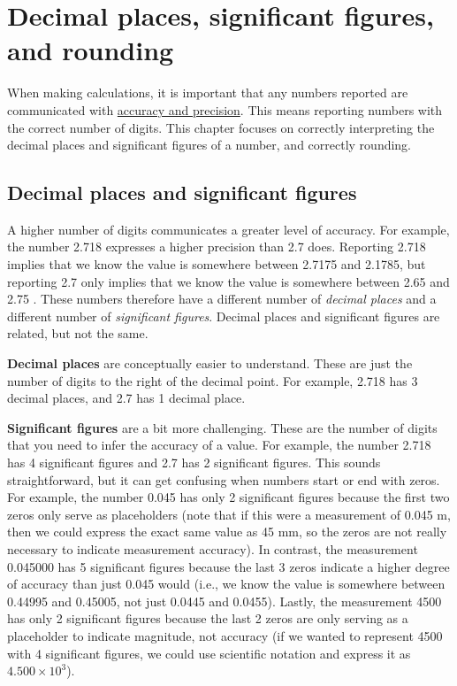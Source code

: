 \documentclass[
  openany]{scrbook}
\begin{document}
\hypertarget{Chapter_9}{%
\chapter{Decimal places, significant figures, and rounding}\label{Chapter_9}}

When making calculations, it is important that any numbers reported are communicated with \protect\hyperlink{Chapter_6}{accuracy and precision}.
This means reporting numbers with the correct number of digits.
This chapter focuses on correctly interpreting the decimal places and significant figures of a number, and correctly rounding.

\hypertarget{decimal-places-and-significant-figures}{%
\section{Decimal places and significant figures}\label{decimal-places-and-significant-figures}}

A higher number of digits communicates a greater level of accuracy.
For example, the number 2.718 expresses a higher precision than 2.7 does.
Reporting 2.718 implies that we know the value is somewhere between 2.7175 and 2.1785, but reporting 2.7 only implies that we know the value is somewhere between 2.65 and 2.75 \citep{Sokal1995}.
These numbers therefore have a different number of \emph{decimal places} and a different number of \emph{significant figures}.
Decimal places and significant figures are related, but not the same.

\textbf{Decimal places} are conceptually easier to understand. These are just the number of digits to the right of the decimal point. For example, 2.718 has 3 decimal places, and 2.7 has 1 decimal place.

\textbf{Significant figures} are a bit more challenging.
These are the number of digits that you need to infer the accuracy of a value.
For example, the number 2.718 has 4 significant figures and 2.7 has 2 significant figures. This sounds straightforward, but it can get confusing when numbers start or end with zeros.
For example, the number 0.045 has only 2 significant figures because the first two zeros only serve as placeholders (note that if this were a measurement of 0.045 m, then we could express the exact same value as 45 mm, so the zeros are not really necessary to indicate measurement accuracy).
In contrast, the measurement 0.045000 has 5 significant figures because the last 3 zeros indicate a higher degree of accuracy than just 0.045 would (i.e., we know the value is somewhere between 0.44995 and 0.45005, not just 0.0445 and 0.0455).
Lastly, the measurement 4500 has only 2 significant figures because the last 2 zeros are only serving as a placeholder to indicate magnitude, not accuracy (if we wanted to represent 4500 with 4 significant figures, we could use scientific notation and express it as \(4.500 \times 10^3\)).
\end{document}
